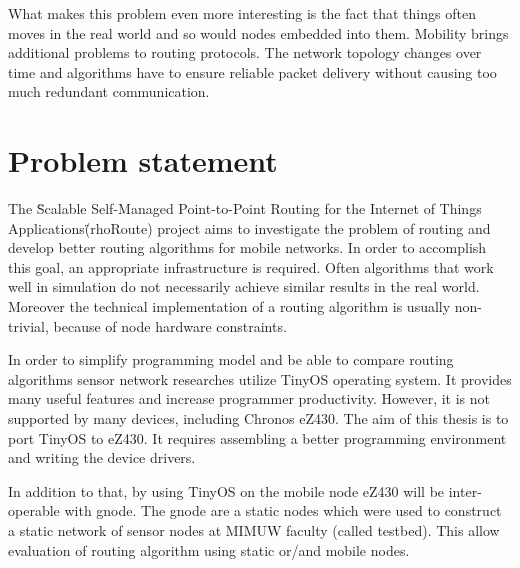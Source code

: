 What makes this problem even more interesting is the fact that things often moves in the real world and so would nodes embedded into them.
Mobility brings additional problems to routing protocols.
The network topology changes over time and algorithms have to ensure reliable packet delivery without causing too much redundant communication.


\section{Problem statement}
The \"Scalable Self-Managed Point-to-Point Routing for the Internet of Things Applications\" (rhoRoute) project aims to investigate the problem of routing and develop better routing algorithms for mobile networks.
In order to accomplish this goal, an appropriate infrastructure is required.
Often algorithms that work well in simulation do not necessarily achieve similar results in the real world. Moreover the technical implementation of a routing algorithm is usually non-trivial, because of node hardware constraints.

In order to simplify programming model and be able to compare routing algorithms sensor network researches utilize TinyOS operating system. It provides many useful features and increase programmer productivity. However, it is not supported by many devices, including Chronos eZ430. The aim of this thesis is to port TinyOS to eZ430. It requires assembling a better programming environment and writing the device drivers.

In addition to that, by using TinyOS on the mobile node eZ430 will be inter-operable with gnode. The gnode are a static nodes which were used to construct a static network of sensor nodes at MIMUW faculty (called testbed). This allow evaluation of routing algorithm using static or/and mobile nodes. 

